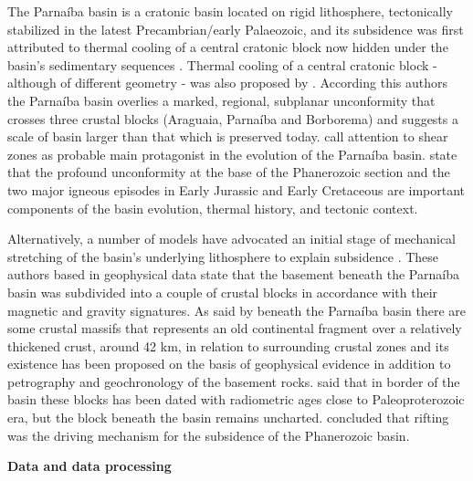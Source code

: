 \documentclass[paper,11pt]{geophysics}
\begin{document}
The Parnaíba basin is a cratonic basin located on rigid lithosphere, tectonically stabilized in the latest Precambrian/early Palaeozoic, and its subsidence was first attributed to thermal cooling of a central cratonic block now hidden under the basin's sedimentary sequences \citep{de_brito_neves_influence_1984}. Thermal cooling of a central cratonic block - although of different geometry - was also proposed by \cite{daly_brasiliano_2014}. According this authors the Parnaíba basin overlies a marked, regional, subplanar unconformity that crosses three crustal
blocks (Araguaia, Parnaíba and Borborema) and suggests a scale of basin larger than that which is preserved today. \cite{cordani_bacia_2009,de_castro_geophysical_2016} call attention to shear zones as probable main protagonist in the evolution of the Parnaíba basin. \cite{daly_brasiliano_2014} state that the profound unconformity at the base of the Phanerozoic section and the two major igneous episodes in Early Jurassic and Early Cretaceous are important components of the basin evolution, thermal history, and tectonic context.

Alternatively, a number of models have advocated an initial stage of mechanical stretching of the basin's underlying lithosphere to explain subsidence \citep{fuck_rodinia_2008,cordani_bacia_2009,de_castro_crustal_2014}. These authors based in geophysical data state that the basement beneath the Parnaíba basin was subdivided into a couple of crustal blocks in accordance with their magnetic and gravity signatures. As said by \cite{de_brito_neves_influence_1984,fuck_rodinia_2008,cordani_bacia_2009,de_castro_crustal_2014} beneath the Parnaíba basin there are some crustal massifs that represents an old continental fragment over a relatively thickened crust, around 42 km, in relation to surrounding crustal zones and its existence has been proposed on the basis of geophysical evidence in addition to petrography and geochronology of the basement rocks. \cite{cordani_bacia_2009} said that in border of the basin these blocks has been dated with radiometric ages close to Paleoproterozoic era, but the block beneath the basin remains uncharted. \cite{de_castro_crustal_2014} concluded that rifting was the driving mechanism for the subsidence of the Phanerozoic
basin.
\linebreak
\linebreak

\begin{flushleft}
\textbf{\LARGE Data and data processing}
\end{flushleft}
\end{document}
